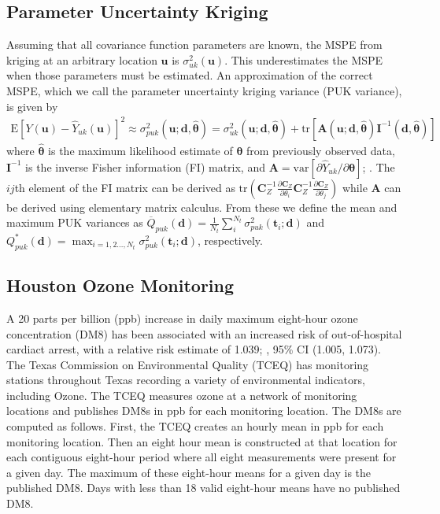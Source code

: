 \documentclass[cmbright]{staauth}
\newcommand{\var}{\mathrm{var}}
\newcommand{\E}{\mathrm{E}}
\newcommand{\tr}{\mathrm{tr}}
\begin{document}
\subsection{Parameter Uncertainty Kriging}
Assuming that all covariance function parameters are known, the MSPE from kriging at an arbitrary location $\bm{u}$ is $\sigma_{uk}^2(\bm{u})$. This underestimates the MSPE when those parameters must be estimated. An approximation of the correct MSPE, which we call the parameter uncertainty kriging variance (PUK variance), is given by 
\begin{align*}
\E[Y(\bm{u}) - \widehat{Y}_{uk}(\bm{u})]^2 \approx \sigma^2_{puk}(\bm{u};\bm{d},\widehat{\bm{\theta}}) = \sigma^2_{uk}(\bm{u};\bm{d},\widehat{\bm{\theta}}) + \tr[\bm{A}(\bm{u};\bm{d},\widehat{\bm{\theta}})\bm{I}^{-1}(\bm{d},\widehat{\bm{\theta}})]
\end{align*}
where $\widehat{\bm{\theta}}$ is the maximum likelihood estimate of $\bm{\theta}$ from previously observed data, $\bm{I}^{-1}$ is the inverse Fisher information (FI) matrix, and $\bm{A} = \var[\partial \widehat{Y}_{uk} /\partial \bm{\theta}]$; \cite{zimmerman1992mean,abt1999estimating}. The $ij$th element of the FI matrix can be derived as $\tr\left(\bm{C}_Z^{-1}\frac{\partial\bm{C}_Z}{\partial\theta_i}\bm{C}_Z^{-1}\frac{\partial\bm{C}_Z}{\partial\theta_j}\right)$ while $\bm{A}$ can be derived using elementary matrix calculus. From these we define the mean and maximum  PUK variances as $\overline{Q}_{puk}(\bm{d}) = \frac{1}{N_t}\sum_{i}^{N_t}\sigma^2_{puk}(\bm{t}_i;\bm{d})$ and $Q_{puk}^*(\bm{d}) = \max_{i=1,2\dots,N_t}\sigma^2_{puk}(\bm{t}_i;\bm{d})$, respectively.

\subsection{Houston Ozone Monitoring}\label{sec:houston}
A 20 parts per billion (ppb) increase in daily maximum eight-hour ozone concentration (DM8) has been associated with an increased risk of out-of-hospital cardiact arrest, with a relative risk estimate of 1.039; \cite{ensor2013case}, 95\% CI (1.005, 1.073). The Texas Commission on Environmental Quality (TCEQ) has monitoring stations throughout Texas recording a variety of environmental indicators, including Ozone. The TCEQ measures ozone at a network of monitoring locations and publishes DM8s in ppb for each monitoring location. The DM8s are computed as follows. First, the TCEQ creates an hourly mean in ppb for each monitoring location. Then an eight hour mean is constructed at that location for each contiguous eight-hour period where all eight measurements were present for a given day. The maximum of these eight-hour means for a given day is the published DM8. Days with less than 18 valid eight-hour means have no published DM8.
\end{document}
